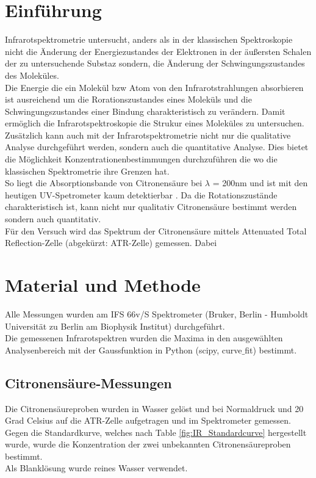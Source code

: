 \documentclass[10pt,a4paper]{article}
\begin{document}
	\section{Einführung}	
	Infrarotspektrometrie untersucht, anders als in der klassischen Spektroskopie nicht die Änderung der Energiezustandes der Elektronen in der äußersten Schalen der zu untersuchende Substaz sondern, die Änderung der Schwingungszustandes des Moleküles.\\
	Die Energie die ein Molekül bzw Atom von den Infrarotstrahlungen absorbieren ist ausreichend um die Rorationszustandes eines Moleküls und die Schwingungszustandes einer Bindung charakteristisch zu verändern.
	Damit ermöglich die Infrarotspektroskopie die Strukur eines Moleküles zu untersuchen.\\
	Zusätzlich kann auch mit der Infrarotspektrometrie nicht nur die qualitative Analyse durchgeführt werden, sondern auch die quantitative Analyse. Dies bietet die Möglichkeit Konzentrationenbestimmungen durchzuführen die wo die klassischen Spektrometrie ihre Grenzen hat.\\
	So liegt die Absorptionsbande von Citronensäure bei $\lambda$ = 200nm und ist mit den heutigen UV-Spetrometer kaum detektierbar \cite{Citricacid_UV}. Da die Rotationszustände charakteristisch ist, kann nicht nur qualitativ Citronensäure bestimmt werden sondern auch quantitativ.\\
	Für den Versuch wird das Spektrum der Citronensäure mittels Attenuated Total Reflection-Zelle (abgekürzt: ATR-Zelle) gemessen. Dabei 
	
	
	
	
	
	
	
	
	
	\section{Material und Methode}
	Alle Messungen wurden am IFS 66v/S Spektrometer (Bruker, Berlin - Humboldt Universität zu Berlin am Biophysik Institut) durchgeführt.\\
	Die gemessenen Infrarotspektren wurden die Maxima in den ausgewählten Analysenbereich mit der Gaussfunktion in Python (scipy, curve$\_$fit) bestimmt.
	
	\subsection{Citronensäure-Messungen}
	Die Citronensäureproben wurden in Wasser gelöst und bei Normaldruck und 20 Grad Celsius auf die ATR-Zelle aufgetragen und im Spektrometer gemessen.\\
	Gegen die Standardkurve, welches nach Table \ref{fig:IR_Standardcurve} hergestellt wurde, wurde die Konzentration der zwei unbekannten Citronensäureproben bestimmt.\\
	Als Blanklösung wurde reines Wasser verwendet.\\
\end{document}
